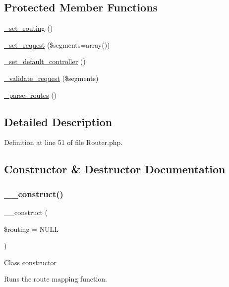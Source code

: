 \subsection*{Protected Member Functions}
\begin{DoxyCompactItemize}
\item 
\mbox{\hyperlink{class_c_i___router_abc9f3e0d48cec66f93a7f103c9a65892}{\+\_\+set\+\_\+routing}} ()
\item 
\mbox{\hyperlink{class_c_i___router_a92b8b486926e4dea5fee4d71f80a472a}{\+\_\+set\+\_\+request}} (\$segments=array())
\item 
\mbox{\hyperlink{class_c_i___router_a86b13067b062022251d2c7ecb4fb9492}{\+\_\+set\+\_\+default\+\_\+controller}} ()
\item 
\mbox{\hyperlink{class_c_i___router_a488aa4aaa52c36c4e6c791e7bfd76358}{\+\_\+validate\+\_\+request}} (\$segments)
\item 
\mbox{\hyperlink{class_c_i___router_a55a42fae865d03334b49baa5a5a6bd0b}{\+\_\+parse\+\_\+routes}} ()
\end{DoxyCompactItemize}


\subsection{Detailed Description}


Definition at line 51 of file Router.\+php.



\subsection{Constructor \& Destructor Documentation}
\mbox{\label{class_c_i___router_a9b81050c9907794a374f5088743a0252}} 
\subsubsection{\texorpdfstring{\_\_construct()}{\_\_construct()}}
{\footnotesize\ttfamily \+\_\+\+\_\+construct (\begin{DoxyParamCaption}\item[{}]{\$routing = {\ttfamily NULL} }\end{DoxyParamCaption})}

Class constructor

Runs the route mapping function.


